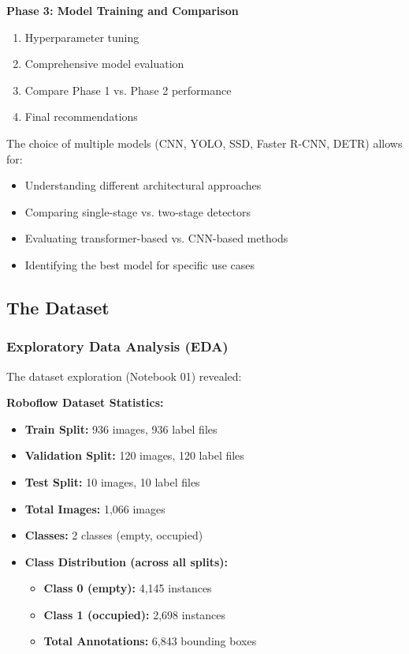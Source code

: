 \documentclass[12pt,a4paper]{article}
\begin{document}
\textbf{Phase 3: Model Training and Comparison}
\begin{enumerate}
    \item Hyperparameter tuning
    \item Comprehensive model evaluation
    \item Compare Phase 1 vs. Phase 2 performance
    \item Final recommendations
\end{enumerate}

The choice of multiple models (CNN, YOLO, SSD, Faster R-CNN, DETR) allows for:
\begin{itemize}
    \item Understanding different architectural approaches
    \item Comparing single-stage vs. two-stage detectors
    \item Evaluating transformer-based vs. CNN-based methods
    \item Identifying the best model for specific use cases
\end{itemize}

\subsection{The Dataset}

\subsubsection{Exploratory Data Analysis (EDA)}

The dataset exploration (Notebook 01) revealed:

\textbf{Roboflow Dataset Statistics:}
\begin{itemize}
    \item \textbf{Train Split:} 936 images, 936 label files
    \item \textbf{Validation Split:} 120 images, 120 label files
    \item \textbf{Test Split:} 10 images, 10 label files
    \item \textbf{Total Images:} 1,066 images
    \item \textbf{Classes:} 2 classes (empty, occupied)
    \item \textbf{Class Distribution (across all splits):}
    \begin{itemize}
        \item \textbf{Class 0 (empty):} 4,145 instances
        \item \textbf{Class 1 (occupied):} 2,698 instances
        \item \textbf{Total Annotations:} 6,843 bounding boxes
    \end{itemize}
\end{itemize}
\end{document}

